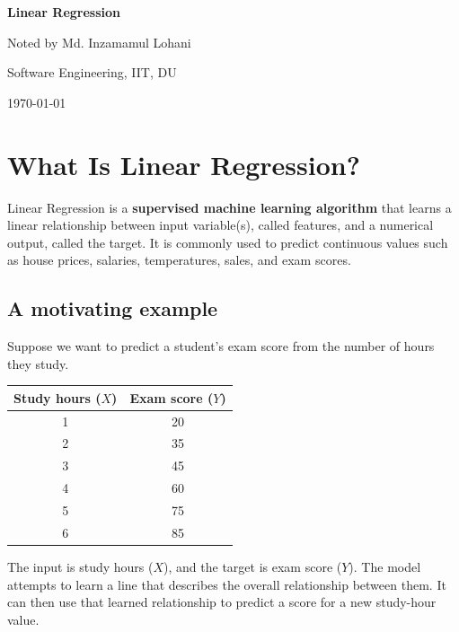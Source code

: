 \documentclass[11pt,a4paper]{article}
\begin{document}
\begin{titlepage}
    \centering
    \vspace*{\fill}
    {\Huge\bfseries Linear Regression\par}
    \vspace{2.5em}
    {\large Noted by Md. Inzamamul Lohani\par}
    \vspace{0.4em}
    {\large Software Engineering, IIT, DU\par}
    \vspace{2em}
    {\large \today\par}
    \vspace*{\fill}
\end{titlepage}
\setcounter{page}{2}

\tableofcontents
\newpage

\section{What Is Linear Regression?}

Linear Regression is a \textbf{supervised machine learning algorithm} that learns a linear relationship between input variable(s), called features, and a numerical output, called the target. It is commonly used to predict continuous values such as house prices, salaries, temperatures, sales, and exam scores.

\subsection{A motivating example}

Suppose we want to predict a student's exam score from the number of hours they study.

\begin{center}
\begin{tabular}{cc}
\toprule
Study hours ($X$) & Exam score ($Y$)\\
\midrule
1 & 20\\
2 & 35\\
3 & 45\\
4 & 60\\
5 & 75\\
6 & 85\\
\bottomrule
\end{tabular}
\end{center}

The input is study hours ($X$), and the target is exam score ($Y$). The model attempts to learn a line that describes the overall relationship between them. It can then use that learned relationship to predict a score for a new study-hour value.
\end{document}
